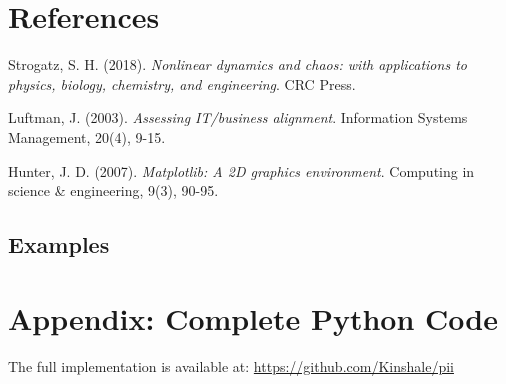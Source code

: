 \documentclass[a4paper, 10pt]{article}
\begin{document}
\section*{References}
\begin{thebibliography}{9}
	Strogatz, S. H. (2018). \textit{Nonlinear dynamics and chaos: with applications to physics, biology, chemistry, and engineering}. CRC Press.

	Luftman, J. (2003). \textit{Assessing IT/business alignment}. Information Systems Management, 20(4), 9-15.

	Hunter, J. D. (2007). \textit{Matplotlib: A 2D graphics environment}. Computing in science \& engineering, 9(3), 90-95.
\end{thebibliography}

\subsection{Examples}
\appendix
\section{Appendix: Complete Python Code}
The full implementation is available at: \url{https://github.com/Kinshale/pii}
\end{document}
